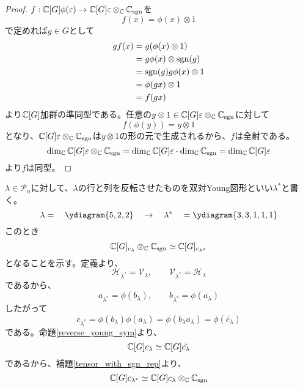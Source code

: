 \documentclass{ltjsreport}
\begin{document}
\begin{proof}
  $f:\mathbb{C}[G]\phi(\varepsilon)\rightarrow\mathbb{C}[G]\varepsilon\otimes_{\mathbb{C}} \mathbb{C}_{\mathrm{sgn}}$を
  \[
  f(x)=\phi(x)\otimes 1  
  \]
  で定めれば$g\in G$として
  \begin{align*}
    gf(x)
    &=g(\phi(x)\otimes 1)\\
    &=g\phi(x)\otimes \mathrm{sgn}(g)\\
    &=\mathrm{sgn}(g)g\phi(x)\otimes 1\\
    &=\phi(gx)\otimes 1\\
    &=f(gx)
  \end{align*}
  より$\mathbb{C}[G]$加群の準同型である。任意の$y\otimes 1\in \mathbb{C}[G]\varepsilon\otimes_{\mathbb{C}} \mathbb{C}_{\mathrm{sgn}}$に対して
  \[
  f(\phi(y))=y\otimes 1  
  \]
  となり、$\mathbb{C}[G]\varepsilon\otimes_{\mathbb{C}} \mathbb{C}_{\mathrm{sgn}}$は$y\otimes 1$の形の元で生成されるから、$f$は全射である。
  \[
  \dim_{\mathbb{C}}\mathbb{C}[G]\varepsilon\otimes_{\mathbb{C}} \mathbb{C}_{\mathrm{sgn}}=\dim_{\mathbb{C}}\mathbb{C}[G]\varepsilon\cdot\dim_{\mathbb{C}}\mathbb{C}_{\mathrm{sgn}}=  \dim_{\mathbb{C}}\mathbb{C}[G]\varepsilon 
  \]
  より$f$は同型。
\end{proof}


\begin{eg}
  $\lambda\in\mathcal{P}_n$に対して、$\lambda$の行と列を反転させたものを双対Young図形といい$\lambda^*$と書く。
  \[
  \lambda=\quad\ydiagram{5,2,2}\quad\rightarrow\quad\lambda^*\quad=\ydiagram{3,3,1,1,1}
  \]
  このとき
  \[
  \mathbb{C}[G]_{c_\lambda}\otimes_{\mathbb{C}}\mathbb{C}_{\mathrm{sgn}}\simeq \mathbb{C}[G]_{c_{\lambda^*}}
  \]
  となることを示す。定義より、
  \[
  \mathcal{H}_{\lambda^*}=\mathcal{V}_{\lambda},\qquad
  \mathcal{V}_{\lambda^*}=\mathcal{H}_{\lambda}  
  \]
  であるから、
  \[
  a_{\lambda^*}=\phi(b_{\lambda}),\qquad b_{\lambda^*}=\phi(a_{\lambda})
  \]
  したがって
  \[
  c_{\lambda^*}=\phi(b_\lambda)\phi(a_\lambda)=\phi(b_\lambda a_\lambda)=\phi(\tilde{c_\lambda})  
  \]
  である。命題\ref{reverse_young_sym}より、
  \[
  \mathbb{C}[G]c_\lambda\simeq \mathbb{C}[G]\tilde{c_\lambda}  
  \]
  であるから、補題\ref{tensor_with_sgn_rep}より、
  \[
  \mathbb{C}[G]c_{\lambda^*}\simeq \mathbb{C}[G]c_\lambda\otimes_{\mathbb{C}}\mathbb{C}_{\mathrm{sgn}}  
  \]
\end{eg}
\end{document}
